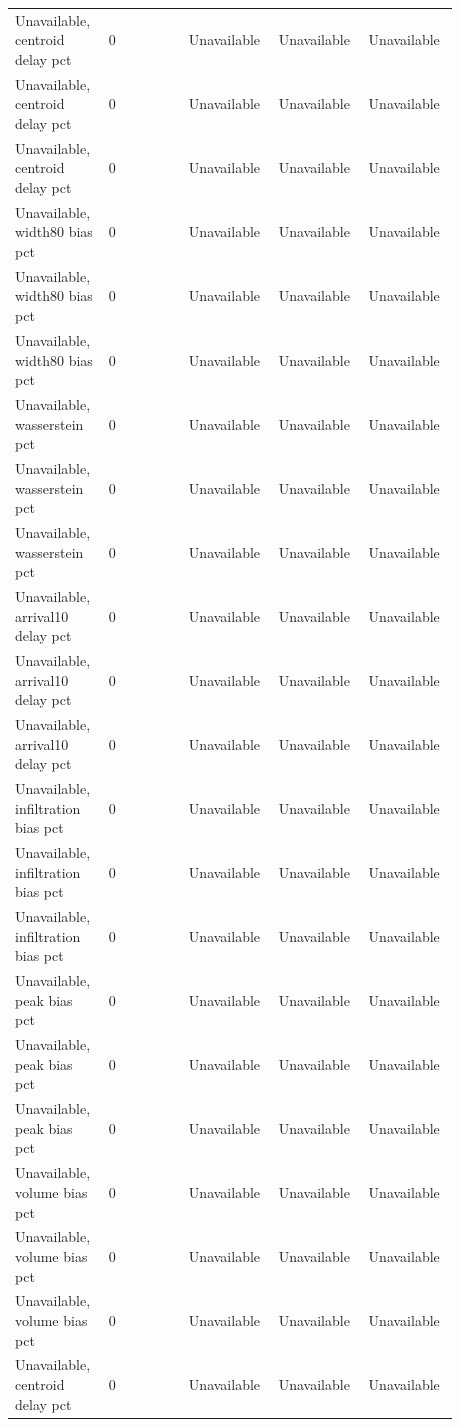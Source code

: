 \begin{longtable}{p{0.1760\linewidth}p{0.1760\linewidth}p{0.1760\linewidth}p{0.1760\linewidth}p{0.1760\linewidth}}
Unavailable, centroid delay pct & 0 & Unavailable & Unavailable & Unavailable \\
Unavailable, centroid delay pct & 0 & Unavailable & Unavailable & Unavailable \\
Unavailable, centroid delay pct & 0 & Unavailable & Unavailable & Unavailable \\
Unavailable, width80 bias pct & 0 & Unavailable & Unavailable & Unavailable \\
Unavailable, width80 bias pct & 0 & Unavailable & Unavailable & Unavailable \\
Unavailable, width80 bias pct & 0 & Unavailable & Unavailable & Unavailable \\
Unavailable, wasserstein pct & 0 & Unavailable & Unavailable & Unavailable \\
Unavailable, wasserstein pct & 0 & Unavailable & Unavailable & Unavailable \\
Unavailable, wasserstein pct & 0 & Unavailable & Unavailable & Unavailable \\
Unavailable, arrival10 delay pct & 0 & Unavailable & Unavailable & Unavailable \\
Unavailable, arrival10 delay pct & 0 & Unavailable & Unavailable & Unavailable \\
Unavailable, arrival10 delay pct & 0 & Unavailable & Unavailable & Unavailable \\
Unavailable, infiltration bias pct & 0 & Unavailable & Unavailable & Unavailable \\
Unavailable, infiltration bias pct & 0 & Unavailable & Unavailable & Unavailable \\
Unavailable, infiltration bias pct & 0 & Unavailable & Unavailable & Unavailable \\
Unavailable, peak bias pct & 0 & Unavailable & Unavailable & Unavailable \\
Unavailable, peak bias pct & 0 & Unavailable & Unavailable & Unavailable \\
Unavailable, peak bias pct & 0 & Unavailable & Unavailable & Unavailable \\
Unavailable, volume bias pct & 0 & Unavailable & Unavailable & Unavailable \\
Unavailable, volume bias pct & 0 & Unavailable & Unavailable & Unavailable \\
Unavailable, volume bias pct & 0 & Unavailable & Unavailable & Unavailable \\
Unavailable, centroid delay pct & 0 & Unavailable & Unavailable & Unavailable \\

\end{longtable}

